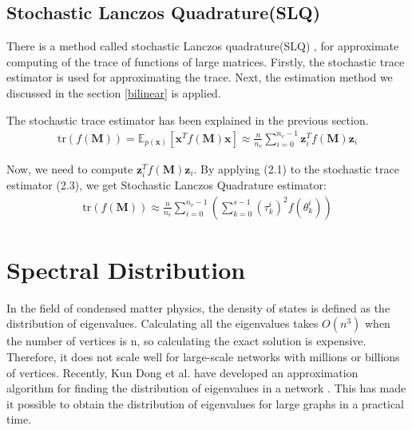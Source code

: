 \documentclass[senior,final,11pt]{iscs-thesis}
\begin{document}
\subsection{Stochastic Lanczos Quadrature(SLQ)}
There is a method called stochastic Lanczos quadrature(SLQ) \cite{ubaru2017fast}, for approximate computing of the trace of functions of large matrices. Firstly, the stochastic trace estimator is used for approximating the trace. Next, the estimation method we discussed in the section \ref{bilinear} is applied.

The stochastic trace estimator has been explained in the previous section.
\begin{align}
    \mathrm{tr}(f(\mathbf{M})) =\mathbb{E}_{p(\mathbf{x})}[\mathbf{x}^{T}f(\mathbf{M})\mathbf{x}] \approx \frac{n}{n_v}\sum_{i=0}^{n_v-1} \mathbf{z}_i^{T}f(\mathbf{M})\mathbf{z}_i
\end{align}

Now, we need to compute $\mathbf{z}_i^{T}f(\mathbf{M})\mathbf{z}_i$. By applying (2.1) to the stochastic trace estimator (2.3), we get Stochastic Lanczos Quadrature estimator:
\begin{align}
    \mathrm{tr}(f(\mathbf{M})) \approx \frac{n}{n_v} \sum_{i=0}^{n_v-1}\left(\sum_{k=0}^{s-1} (\tau_k^i)^2 f(\theta_k^i) \right)
\end{align}



\section{Spectral Distribution}
In the field of condensed matter physics, the density of states is defined as the distribution of eigenvalues. Calculating all the eigenvalues takes $O(n^3)$ when the number of vertices is n, so calculating the exact solution is expensive. Therefore, it does not scale well for large-scale networks with millions or billions of vertices. Recently, Kun Dong et al.\cite{dong2019network} have developed an approximation algorithm for finding the distribution of eigenvalues in a network . This has made it possible to obtain the distribution of eigenvalues for large graphs in a practical time.
\end{document}
